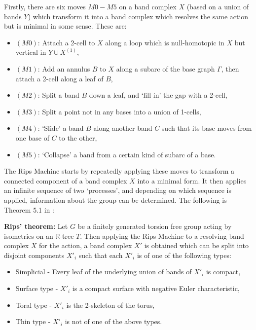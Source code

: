 Firstly, there are six moves $M0-M5$ on a band complex $X$ (based on a union of bands $Y$) which transform it into a band complex which resolves the same action but is minimal in some sense. These are:
\begin{itemize}
    \item $(M0)$: Attach a 2-cell to $X$ along a loop which is null-homotopic in $X$ but vertical in $Y\cup X^{(1)}$,
    \item $(M1)$: Add an annulus $B$ to $X$ along a subarc of the base graph $\Gamma$, then attach a 2-cell along a leaf of $B$,
    \item $(M2)$: Split a band $B$ down a leaf, and `fill in' the gap with a 2-cell,
    \item $(M3)$: Split a point not in any bases into a union of 1-cells,
    \item $(M4)$: `Slide' a band $B$ along another band $C$ such that its base moves from one base of $C$ to the other,
    \item $(M5)$: `Collapse' a band from a certain kind of subarc of a base.
\end{itemize}

The Rips Machine starts by repeatedly applying these moves to transform a connected component of a band complex $X$ into a minimal form. It then applies an infinite sequence of two `processes', and depending on which sequence is applied, information about the group can be determined. The following is Theorem 5.1 in \cite{Bestvina_trees}:

\begin{theorem}
    \textbf{Rips' theorem:} Let $G$ be a finitely generated torsion free group acting by isometries on an $\mathbb{R}$-tree $T$. Then applying the Rips Machine to a resolving band complex $X$ for the action, a band complex $X'$ is obtained which can be split into disjoint components $X'_i$ such that each $X'_i$ is of one of the following types:
    \begin{itemize}
        \item \textnormal{Simplicial} - Every leaf of the underlying union of bands of $X'_i$ is compact,
        \item \textnormal{Surface type} - $X'_i$ is a compact surface with negative Euler characteristic,
        \item \textnormal{Toral type} - $X'_i$ is the 2-skeleton of the torus,
        \item \textnormal{Thin type} - $X'_i$ is not of one of the above types.
    \end{itemize}
\end{theorem}

